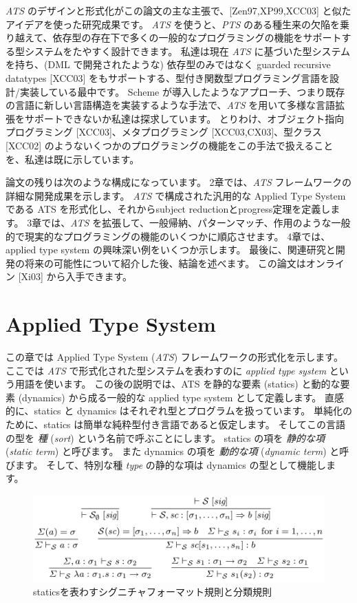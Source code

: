 \documentclass[submit,techreq,noauthor,onecolumn]{ipsj}
\begin{document}
{\it ATS} のデザインと形式化がこの論文の主な主張で、[Zen97,XP99,XCC03] と似たアイデアを使った研究成果です。
{\it ATS} を使うと、{\it PTS} のある種生来の欠陥を乗り越えて、依存型の存在下で多くの一般的なプログラミングの機能をサポートする型システムをたやすく設計できます。
私達は現在 {\it ATS} に基づいた型システムを持ち、(DML で開発されたような) 依存型のみではなく guarded recursive datatypes [XCC03] をもサポートする、型付き関数型プログラミング言語を設計/実装している最中です。
Scheme が導入したようなアプローチ、つまり既存の言語に新しい言語構造を実装するような手法で、{\it ATS} を用いて多様な言語拡張をサポートできないか私達は探求しています。
とりわけ、オブジェクト指向プログラミング [XCC03]、メタプログラミング [XCC03,CX03]、型クラス [XCC02] のようないくつかのプログラミングの機能をこの手法で扱えることを、私達は既に示しています。

論文の残りは次のような構成になっています。
2章では、{\it ATS} フレームワークの詳細な開発成果を示します。
{\it ATS} で構成された汎用的な Applied Type System である ATS を形式化し、それからsubject reductionとprogress定理を定義します。
3章では、{\it ATS} を拡張して、一般帰納、パターンマッチ、作用のような一般的で現実的なプログラミングの機能のいくつかに順応させます。
4章では、applied type system の興味深い例をいくつか示します。
最後に、関連研究と開発の将来の可能性について紹介した後、結論を述べます。
この論文はオンライン [Xi03] から入手できます。

\section{Applied Type System}

この章では Applied Type System ({\it ATS}) フレームワークの形式化を示します。
ここでは {\it ATS} で形式化された型システムを表わすのに {\it applied type system} という用語を使います。
この後の説明では、ATS を静的な要素 (statics) と動的な要素 (dynamics) から成る一般的な applied type system として定義します。
直感的に、statics と dynamics はそれぞれ型とプログラムを扱っています。
単純化のために、statics は簡単な純粋型付き言語であると仮定します。
そしてこの言語の型を {\it 種} ({\it sort}) という名前で呼ぶことにします。
statics の項を {\it 静的な項} ({\it static term}) と呼びます。
また dynamics の項を {\it 動的な項} ({\it dynamic term}) と呼びます。
そして、特別な種 {\it type} の静的な項は dynamics の型として機能します。

\begin{figure}[h]
\centering
\includegraphics[width=14cm]{img/fig1_rules.png}
\caption{staticsを表わすシグニチャフォーマット規則と分類規則}
\label{fig:fig1_rules}
\end{figure}
\end{document}
